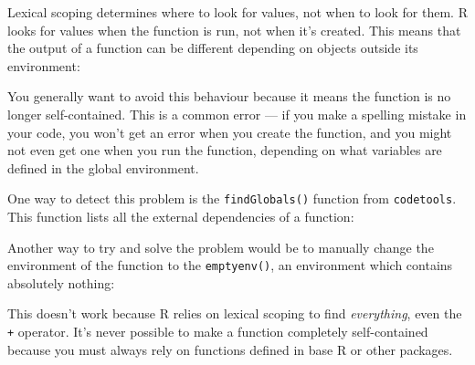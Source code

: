 Lexical scoping determines where to look for values, not when to look
for them. R looks for values when the function is run, not when it's
created. This means that the output of a function can be different
depending on objects outside its environment:

\begin{Shaded}
\begin{Highlighting}[]
\StringTok{ }
\StringTok{ }
\NormalTok{()}

\StringTok{ }
\NormalTok{()}
\end{Highlighting}
\end{Shaded}

You generally want to avoid this behaviour because it means the function
is no longer self-contained. This is a common error --- if you make a
spelling mistake in your code, you won't get an error when you create
the function, and you might not even get one when you run the function,
depending on what variables are defined in the global environment.

One way to detect this problem is the \texttt{findGlobals()} function
from \texttt{codetools}. This function lists all the external
dependencies of a function: 

\begin{Shaded}
\begin{Highlighting}[]
\StringTok{ }\StringTok{ }
\end{Highlighting}
\end{Shaded}

Another way to try and solve the problem would be to manually change the
environment of the function to the \texttt{emptyenv()}, an environment
which contains absolutely nothing:

\begin{Shaded}
\begin{Highlighting}[]
\StringTok{ }\NormalTok{()}
\NormalTok{()}
\end{Highlighting}
\end{Shaded}

This doesn't work because R relies on lexical scoping to find
\emph{everything}, even the \texttt{+} operator. It's never possible to
make a function completely self-contained because you must always rely
on functions defined in base R or other packages.

